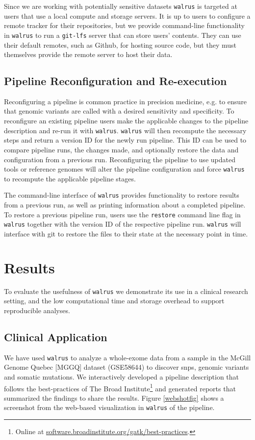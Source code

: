 Since we are working with potentially sensitive datasets \texttt{walrus} is
targeted at users that use a local compute and storage servers. It is up to
users to configure a remote tracker for their repositories, but we provide
command-line functionality in \texttt{walrus} to run a \texttt{git-lfs} server
that can store users' contents.  They can use their default remotes, such as
Github, for hosting source code, but they must themselves provide the remote
server to host their data.

\subsection{Pipeline Reconfiguration and Re-execution}
Reconfiguring a pipeline is common practice in precision medicine, e.g. to
ensure that genomic variants are called with a desired sensitivity and
specificity.  To reconfigure an existing pipeline users make the applicable
changes to the pipeline description and re-run it with \texttt{walrus}.
\texttt{walrus} will then recompute the necessary steps and return a version ID
for the newly run pipeline. This ID can be used to compare pipeline runs, the
changes made, and optionally restore the data and configuration from a
previous run.  Reconfiguring the pipeline to use updated tools or reference
genomes will alter the pipeline configuration and force \texttt{walrus} to
recompute the applicable pipeline stages. 

The command-line interface of \texttt{walrus} provides functionality to restore
results from a previous run, as well as printing information about a completed
pipeline.  To restore a previous pipeline run, users use the \texttt{restore}
command line flag in \texttt{walrus} together with the version ID of the
respective pipeline run. \texttt{walrus} will interface with git to restore the
files to their state at the necessary point in time.

\section{Results}
To evaluate the usefulness of \texttt{walrus} we demonstrate its use in a
clinical research setting, and the low computational time and storage overhead
to support reproducible analyses.

\subsection{Clinical Application} 
We have used \texttt{walrus} to analyze a whole-exome data from a sample
in the McGill Genome Quebec [MGGQ] dataset (GSE58644)\cite{tofigh2014prognostic}
to discover \glspl{snp}, genomic variants and somatic mutations. We
interactively developed a pipeline description that follows the best-practices
of The Broad Institute\footnote{Online at
\url{software.broadinstitute.org/gatk/best-practices}.} and generated reports
that summarized the findings to share the results. Figure \ref{webshotfig} shows
a screenshot from the web-based visualization in \texttt{walrus} of the
pipeline. 

